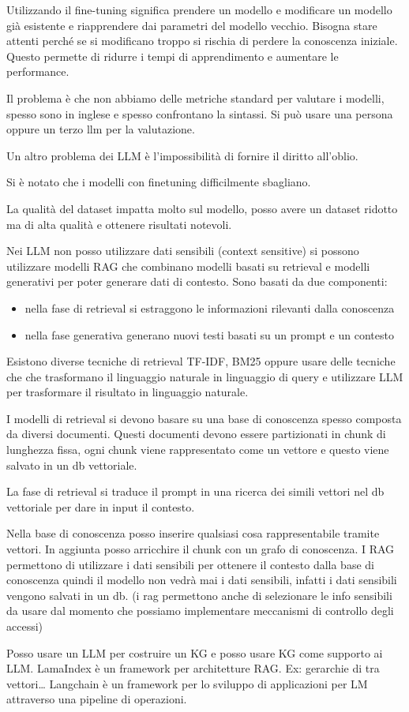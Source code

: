 Utilizzando il fine-tuning significa prendere un modello e modificare un modello
già esistente e riapprendere dai parametri del modello vecchio. Bisogna
stare attenti perché se si modificano troppo si rischia di perdere la conoscenza
iniziale. Questo permette di ridurre i tempi di apprendimento e aumentare le
performance.

Il problema è che non abbiamo delle metriche standard per valutare i modelli,
spesso sono in inglese e spesso confrontano la sintassi. Si può usare una persona
oppure un terzo llm per la valutazione.

Un altro problema dei LLM è l'impossibilità di fornire il diritto all'oblio.

Si è notato che i modelli con finetuning difficilmente sbagliano.

La qualità del dataset impatta molto sul modello, posso avere un dataset ridotto
ma di alta qualità e ottenere risultati notevoli.

Nei LLM non posso utilizzare dati sensibili (context sensitive) si possono utilizzare
modelli RAG che combinano modelli basati su retrieval e modelli generativi
per poter generare dati di contesto. Sono basati da due componenti:
\begin{itemize}
    \item nella fase di retrieval si estraggono le informazioni rilevanti dalla
          conoscenza
    \item nella fase generativa generano nuovi testi basati su un prompt e un
          contesto
\end{itemize}
Esistono diverse tecniche di retrieval TF-IDF, BM25 oppure usare delle tecniche che
che trasformano il linguaggio naturale in linguaggio di query e utilizzare LLM
per trasformare il risultato in linguaggio naturale.

I modelli di retrieval si devono basare su una base di conoscenza spesso composta
da diversi documenti. Questi documenti devono essere partizionati in chunk di
lunghezza fissa, ogni chunk viene rappresentato come un vettore e questo viene
salvato in un db vettoriale.

La fase di retrieval si traduce il prompt in una ricerca dei simili vettori nel
db vettoriale per dare in input il contesto.

Nella base di conoscenza posso inserire qualsiasi cosa rappresentabile tramite
vettori. In aggiunta posso arricchire il chunk con un grafo di conoscenza.
I RAG permettono di utilizzare i dati sensibili per ottenere il contesto dalla base
di conoscenza quindi il modello non vedrà mai i dati sensibili, infatti i dati
sensibili vengono salvati in un db.  (i rag permettono anche di selezionare
le info sensibili da usare dal momento che possiamo implementare meccanismi di
controllo degli accessi)

Posso usare un LLM per costruire un KG e posso usare KG come supporto ai LLM.
LamaIndex è un framework per architetture RAG. Ex: gerarchie di tra vettori\dots
Langchain è un framework per lo sviluppo di applicazioni per LM attraverso una
pipeline di operazioni.